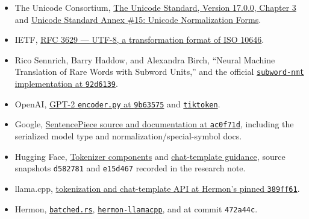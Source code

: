 \documentclass[
  10pt,
]{article}
\providecommand{\tightlist}{%
  \setlength{\itemsep}{0pt}\setlength{\parskip}{0pt}}
\begin{document}
\begin{itemize}
\tightlist
\item
  The Unicode Consortium,
  \href{https://www.unicode.org/versions/Unicode17.0.0/core-spec/chapter-3/}{The
  Unicode Standard, Version 17.0.0, Chapter 3} and
  \href{https://www.unicode.org/reports/tr15/}{Unicode Standard Annex
  \#15: Unicode Normalization Forms}.
\item
  IETF, \href{https://www.rfc-editor.org/rfc/rfc3629}{RFC 3629 ---
  UTF-8, a transformation format of ISO 10646}.
\item
  Rico Sennrich, Barry Haddow, and Alexandra Birch, ``Neural Machine
  Translation of Rare Words with Subword Units,'' and the official
  \href{https://github.com/rsennrich/subword-nmt/tree/92d6139d07d30e12735a0af9e7f7f925ebe62c54}{\texttt{subword-nmt}
  implementation at \texttt{92d6139}}.
\item
  OpenAI,
  \href{https://github.com/openai/gpt-2/blob/9b63575ef42771a015060c964af2c3da4cf7c8ab/src/encoder.py}{GPT-2
  \texttt{encoder.py} at \texttt{9b63575}} and
  \href{https://github.com/openai/tiktoken}{\texttt{tiktoken}}.
\item
  Google,
  \href{https://github.com/google/sentencepiece/tree/ac0f71dcbc85f94292266e55bf6cee1b4d6c9dc1}{SentencePiece
  source and documentation at \texttt{ac0f71d}}, including the
  serialized model type and normalization/special-symbol docs.
\item
  Hugging Face,
  \href{https://huggingface.co/docs/tokenizers/components}{Tokenizer
  components} and
  \href{https://huggingface.co/docs/transformers/chat_templating}{chat-template
  guidance}, source snapshots \texttt{d582781} and \texttt{e15d467}
  recorded in the research note.
\item
  llama.cpp,
  \href{https://github.com/ggml-org/llama.cpp/blob/389ff61d77b5c71cec0cf92fe4e5d01ace80b797/include/llama.h}{tokenization
  and chat-template API at Hermon's pinned \texttt{389ff61}}.
\item
  Hermon,
  \href{https://github.com/hermonai/hermon/blob/472a44cdb511b2dae6c9569e59543db8f8350b25/crates/hermon-runtime/src/batched.rs}{\texttt{batched.rs}},
  \href{https://github.com/hermonai/hermon/blob/472a44cdb511b2dae6c9569e59543db8f8350b25/crates/hermon-llamacpp/src/linked.rs}{\texttt{hermon-llamacpp}},
  and
  \href{https://github.com/hermonai/hermon/blob/472a44cdb511b2dae6c9569e59543db8f8350b25/crates/hermon-tokenizer/src/lib.rs}{\texttt{}}
  at commit \texttt{472a44c}.
\end{itemize}
\end{document}
